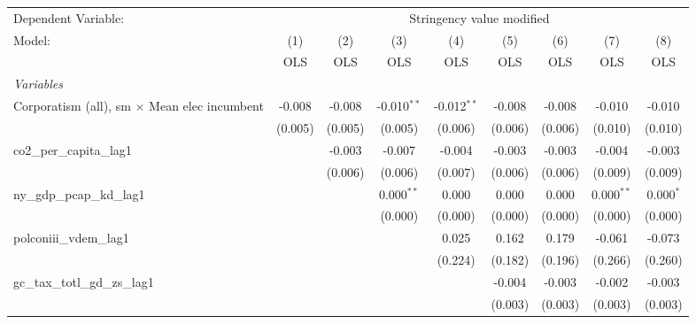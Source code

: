 
\begingroup
\centering
\begin{tabular}{lcccccccc}
   \toprule
   Dependent Variable: & \multicolumn{8}{c}{Stringency value modified}\\
   Model:                                              & (1)     & (2)     & (3)           & (4)           & (5)     & (6)     & (7)          & (8)\\  
                                                       &  OLS    & OLS     & OLS           & OLS           & OLS     & OLS     & OLS          & OLS\\  
   \midrule
   \emph{Variables}\\
   Corporatism (all), sm $\times$ Mean elec incumbent  & -0.008  & -0.008  & -0.010$^{**}$ & -0.012$^{**}$ & -0.008  & -0.008  & -0.010       & -0.010\\   
                                                       & (0.005) & (0.005) & (0.005)       & (0.006)       & (0.006) & (0.006) & (0.010)      & (0.010)\\   
   co2\_per\_capita\_lag1                              &         & -0.003  & -0.007        & -0.004        & -0.003  & -0.003  & -0.004       & -0.003\\   
                                                       &         & (0.006) & (0.006)       & (0.007)       & (0.006) & (0.006) & (0.009)      & (0.009)\\   
   ny\_gdp\_pcap\_kd\_lag1                             &         &         & 0.000$^{**}$  & 0.000         & 0.000   & 0.000   & 0.000$^{**}$ & 0.000$^{*}$\\   
                                                       &         &         & (0.000)       & (0.000)       & (0.000) & (0.000) & (0.000)      & (0.000)\\   
   polconiii\_vdem\_lag1                               &         &         &               & 0.025         & 0.162   & 0.179   & -0.061       & -0.073\\   
                                                       &         &         &               & (0.224)       & (0.182) & (0.196) & (0.266)      & (0.260)\\   
   gc\_tax\_totl\_gd\_zs\_lag1                         &         &         &               &               & -0.004  & -0.003  & -0.002       & -0.003\\   
                                                       &         &         &               &               & (0.003) & (0.003) & (0.003)      & (0.003)\\   

\end{tabular}
